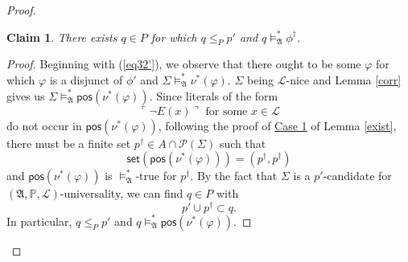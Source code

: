 \documentclass[12pt, twoside]{memoir}
\numberwithin{equation}{section}
\newtheorem{claim2}[thm]{Claim}
\theoremstyle{definition}
\theoremstyle{remark}
\theoremstyle{definition}
\theoremstyle{definition}
\theoremstyle{definition}
\theoremstyle{remark}
\begin{document}
\begin{proof}
\begin{enumerate}[label=Case \arabic*:, leftmargin=50pt]
    \begin{claim2}\label{claim335}
    There exists $q \in P$ for which $q \leq_P p'$ and $q \models^{*}_{\mathfrak{A}} \phi^{\dagger}$.
    \end{claim2}

    \begin{proof}
    Beginning with (\ref{eq32'}), we observe that there ought to be some $\varphi$ for which $\varphi$ is a disjunct of $\phi'$ and $\Sigma \models^{*}_{\mathfrak{A}} \nu^*(\varphi)$. $\Sigma$ being $\mathcal{L}$-nice and Lemma \ref{corr} gives us $\Sigma \models^{*}_{\mathfrak{A}} \mathsf{pos}(\nu^*(\varphi))$. 
    Since literals of the form $$\ulcorner \neg E(x) \urcorner \text{ for some } x \in \mathcal{L}$$ do not occur in $\mathsf{pos}(\nu^*(\varphi))$, following the proof of \hyperref[5132c1]{Case 1} of Lemma \ref{exist}, there must be a finite set $p^{\dagger} \in A \cap \mathcal{P}(\Sigma)$ such that $$\mathsf{set}(\mathsf{pos}(\nu^*(\varphi))) = (p^{\dagger}, p^{\dagger})$$ and $\mathsf{pos}(\nu^*(\varphi))$ is $\models^{*}_{\mathfrak{A}}$-true for $p^{\dagger}$. By the fact that $\Sigma$ is a $p'$-candidate for $(\mathfrak{A}, \mathbb{P}, \mathcal{L})$-universality, we can find $q \in P$ with $$p' \cup p^{\dagger} \subset q.$$ In particular, $q \leq_P p'$ and $q \models^{*}_{\mathfrak{A}} \mathsf{pos}(\nu^*(\varphi))$.
    

\end{proof}
\end{enumerate}
\end{proof}
\end{document}
